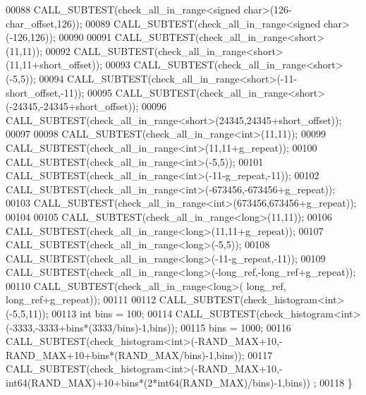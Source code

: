 \begin{DoxyCode}
00088   CALL\_SUBTEST(check\_all\_in\_range<signed char>(126-char\_offset,126));
00089   CALL\_SUBTEST(check\_all\_in\_range<signed char>(-126,126));
00090 
00091   CALL\_SUBTEST(check\_all\_in\_range<short>(11,11));
00092   CALL\_SUBTEST(check\_all\_in\_range<short>(11,11+short\_offset));
00093   CALL\_SUBTEST(check\_all\_in\_range<short>(-5,5));
00094   CALL\_SUBTEST(check\_all\_in\_range<short>(-11-short\_offset,-11));
00095   CALL\_SUBTEST(check\_all\_in\_range<short>(-24345,-24345+short\_offset));
00096   CALL\_SUBTEST(check\_all\_in\_range<short>(24345,24345+short\_offset));
00097 
00098   CALL\_SUBTEST(check\_all\_in\_range<int>(11,11));
00099   CALL\_SUBTEST(check\_all\_in\_range<int>(11,11+g\_repeat));
00100   CALL\_SUBTEST(check\_all\_in\_range<int>(-5,5));
00101   CALL\_SUBTEST(check\_all\_in\_range<int>(-11-g\_repeat,-11));
00102   CALL\_SUBTEST(check\_all\_in\_range<int>(-673456,-673456+g\_repeat));
00103   CALL\_SUBTEST(check\_all\_in\_range<int>(673456,673456+g\_repeat));
00104 
00105   CALL\_SUBTEST(check\_all\_in\_range<long>(11,11));
00106   CALL\_SUBTEST(check\_all\_in\_range<long>(11,11+g\_repeat));
00107   CALL\_SUBTEST(check\_all\_in\_range<long>(-5,5));
00108   CALL\_SUBTEST(check\_all\_in\_range<long>(-11-g\_repeat,-11));
00109   CALL\_SUBTEST(check\_all\_in\_range<long>(-long\_ref,-long\_ref+g\_repeat));
00110   CALL\_SUBTEST(check\_all\_in\_range<long>( long\_ref, long\_ref+g\_repeat));
00111 
00112   CALL\_SUBTEST(check\_histogram<int>(-5,5,11));
00113   \textcolor{keywordtype}{int} bins = 100;
00114   CALL\_SUBTEST(check\_histogram<int>(-3333,-3333+bins*(3333/bins)-1,bins));
00115   bins = 1000;
00116   CALL\_SUBTEST(check\_histogram<int>(-RAND\_MAX+10,-RAND\_MAX+10+bins*(RAND\_MAX/bins)-1,bins));
00117   CALL\_SUBTEST(check\_histogram<int>(-RAND\_MAX+10,-int64(RAND\_MAX)+10+bins*(2*int64(RAND\_MAX)/bins)-1,bins))
      ;
00118 \}
\end{DoxyCode}
